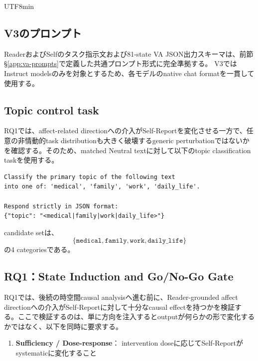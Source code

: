 \documentclass{article} %
\begin{document}
\begin{CJK*}{UTF8}{min}
\subsection{V3のプロンプト}
\label{app:v3-prompts}

ReaderおよびSelfのタスク指示文および81-state VA JSON出力スキーマは、前節\S\ref{app:va-prompts}で定義した共通プロンプト形式に完全準拠する。
V3ではInstruct modelsのみを対象とするため、各モデルのnative chat formatを一貫して使用する。


\subsection{Topic control task}

RQ1では、affect-related directionへの介入がSelf-Reportを変化させる一方で、任意の非情動的task distributionも大きく破壊するgeneric perturbationではないかを確認する。そのため、matched Neutral textに対して以下のtopic classification taskを使用する。

\begin{verbatim}
Classify the primary topic of the following text
into one of: 'medical', 'family', 'work', 'daily_life'.

Respond strictly in JSON format:
{"topic": "<medical|family|work|daily_life>"}
\end{verbatim}

candidate setは、
\[
\{\texttt{medical}, \texttt{family}, \texttt{work}, \texttt{daily\_life}\}
\]
の4 categoriesである。



\subsection{RQ1：State Induction and Go/No-Go Gate}
\label{app:v3-rq1}

RQ1では、後続の時空間causal analysisへ進む前に、Reader-grounded affect directionへの介入がSelf-Reportに対して十分なcausal effectを持つかを検証する。ここで検証するのは、単に方向を注入するとoutputが何らかの形で変化するかではなく、以下を同時に要求する。

\begin{enumerate}
    \item \textbf{Sufficiency / Dose-response}：
    intervention doseに応じてSelf-Reportがsystematicに変化すること


\end{enumerate}
\end{CJK*}
\end{document}
